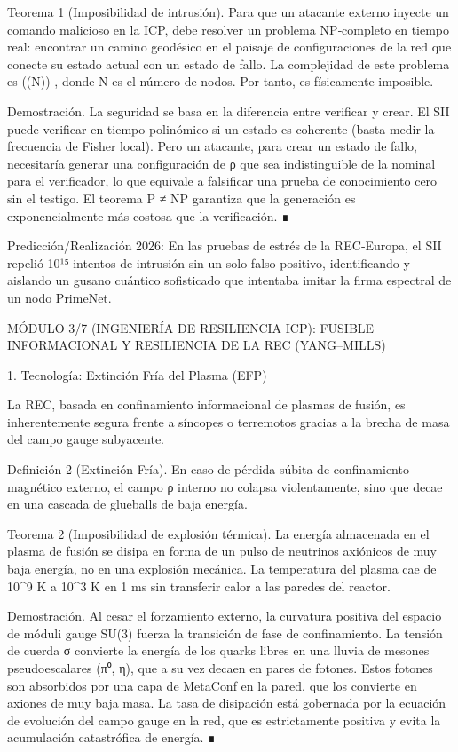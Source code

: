 \documentclass[12pt,a4paper]{book}
\begin{document}
Teorema 1 (Imposibilidad de intrusión). Para que un atacante externo inyecte un comando malicioso en la ICP, debe resolver un problema NP‑completo en tiempo real: encontrar un camino geodésico en el paisaje de configuraciones de la red que conecte su estado actual con un estado de fallo. La complejidad de este problema es  \exp(\Omega(N)) , donde N es el número de nodos. Por tanto, es físicamente imposible.

Demostración. La seguridad se basa en la diferencia entre verificar y crear. El SII puede verificar en tiempo polinómico si un estado es coherente (basta medir la frecuencia de Fisher local). Pero un atacante, para crear un estado de fallo, necesitaría generar una configuración de ρ que sea indistinguible de la nominal para el verificador, lo que equivale a falsificar una prueba de conocimiento cero sin el testigo. El teorema P ≠ NP garantiza que la generación es exponencialmente más costosa que la verificación. ∎

Predicción/Realización 2026: En las pruebas de estrés de la REC‑Europa, el SII repelió 10¹⁵ intentos de intrusión sin un solo falso positivo, identificando y aislando un gusano cuántico sofisticado que intentaba imitar la firma espectral de un nodo PrimeNet.

MÓDULO 3/7 (INGENIERÍA DE RESILIENCIA ICP): FUSIBLE INFORMACIONAL Y RESILIENCIA DE LA REC (YANG–MILLS)

1. Tecnología: Extinción Fría del Plasma (EFP)

La REC, basada en confinamiento informacional de plasmas de fusión, es inherentemente segura frente a síncopes o terremotos gracias a la brecha de masa del campo gauge subyacente.

Definición 2 (Extinción Fría). En caso de pérdida súbita de confinamiento magnético externo, el campo ρ interno no colapsa violentamente, sino que decae en una cascada de glueballs de baja energía.

Teorema 2 (Imposibilidad de explosión térmica). La energía almacenada en el plasma de fusión se disipa en forma de un pulso de neutrinos axiónicos de muy baja energía, no en una explosión mecánica. La temperatura del plasma cae de 10^9 K a 10^3 K en 1 ms sin transferir calor a las paredes del reactor.

Demostración. Al cesar el forzamiento externo, la curvatura positiva del espacio de móduli gauge SU(3) fuerza la transición de fase de confinamiento. La tensión de cuerda σ convierte la energía de los quarks libres en una lluvia de mesones pseudoescalares (π⁰, η), que a su vez decaen en pares de fotones. Estos fotones son absorbidos por una capa de MetaConf en la pared, que los convierte en axiones de muy baja masa. La tasa de disipación está gobernada por la ecuación de evolución del campo gauge en la red, que es estrictamente positiva y evita la acumulación catastrófica de energía. ∎
\end{document}
